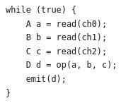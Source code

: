 \documentclass[varwidth=4.8cm]{standalone}
\begin{document}
\begin{verbatim}
while (true) {
	A a = read(ch0);
	B b = read(ch1);
	C c = read(ch2);
	D d = op(a, b, c);
	emit(d);
}
\end{verbatim}
\end{document}
